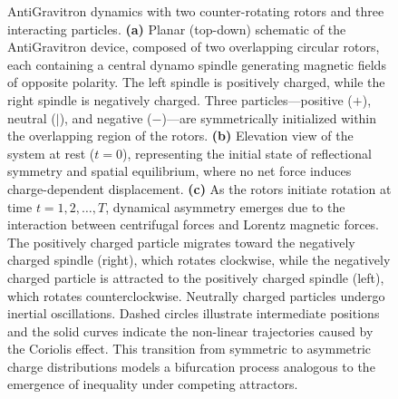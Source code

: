 \documentclass[11pt]{article}
\begin{document}
\begin{figure}[ht!]

   \caption{AntiGravitron dynamics with two counter-rotating rotors and three interacting particles. \textbf{(a)} Planar (top-down) schematic of the AntiGravitron device, composed of two overlapping circular rotors, each containing a central dynamo spindle generating magnetic fields of opposite polarity. The left spindle is positively charged, while the right spindle is negatively charged. Three particles—positive ($+$), neutral ($|$), and negative ($-$)—are symmetrically initialized within the overlapping region of the rotors. \textbf{(b)} Elevation view of the system at rest ($t = 0$), representing the initial state of reflectional symmetry and spatial equilibrium, where no net force induces charge-dependent displacement. \textbf{(c)} As the rotors initiate rotation at time $t = 1, 2, \dots, T$, dynamical asymmetry emerges due to the interaction between centrifugal forces and Lorentz magnetic forces. The positively charged particle migrates toward the negatively charged spindle (right), which rotates clockwise, while the negatively charged particle is attracted to the positively charged spindle (left), which rotates counterclockwise. Neutrally charged particles undergo inertial oscillations. Dashed circles illustrate intermediate positions and the solid curves indicate the non-linear trajectories caused by the Coriolis effect. This transition from symmetric to asymmetric charge distributions models a bifurcation process analogous to the emergence of inequality under competing attractors.}
    \label{fig:AntiGravitron}
\end{figure}
\end{document}
